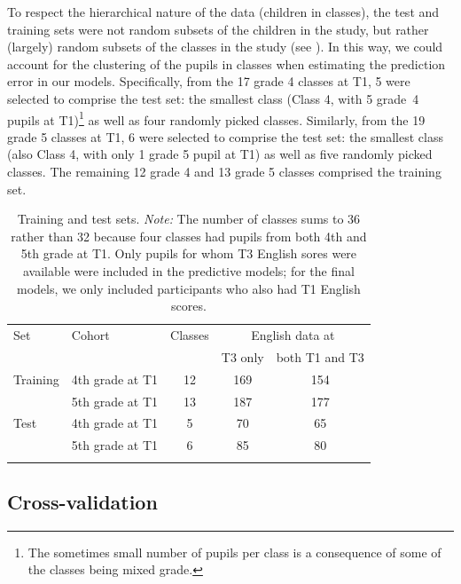 \documentclass[output=paper]{langsci/langscibook}
\begin{document}
To respect the hierarchical nature of the data (children in classes), the test and training sets were not random subsets of the children in the study, but rather (largely) random subsets of the classes in the study (see \citealt{RobertsEtAl2017}). In this way, we could account for the clustering of the pupils in classes when estimating the prediction error in our models. Specifically, from the 17 grade 4 classes at T1, 5 were selected to comprise the test set: the smallest class (Class 4, with 5 grade~4 pupils at T1)\footnote{The sometimes small number of pupils per class is a consequence of some of the classes being mixed grade.} as well as four randomly picked classes. Similarly, from the 19 grade 5 classes at T1, 6 were selected to comprise the test set: the smallest class (also Class 4, with only 1 grade 5 pupil at T1) as well as five randomly picked classes. The remaining 12 grade 4 and 13 grade 5 classes comprised the training set.


\begin{table}
\caption{Training and test sets. \emph{Note:} The number of classes sums to 36 rather than 32 because four classes had pupils from both 4th and 5th grade at T1. Only pupils for whom T3 English sores were available were included in the predictive models; for the final models, we only included participants who also had T1 English scores.\label{tab:04:1}}
\begin{tabular}{ll *{3}{c}}
\lsptoprule
{Set} & {Cohort} & {Classes} & \multicolumn{2}{c}{English data at}\\\cmidrule(lr){4-5}
      &          &           & {T3 only} & {both T1 and T3}\\\midrule
{Training} & {4th grade at T1} & {12} & {169} & {154}\\
           & {5th grade at T1} & {13} & {187} & {177}\\
{Test}     & {4th grade at T1} & {5} & {70} & {65}\\
           & {5th grade at T1} & {6} & {85} & {80}\\
\lspbottomrule
\end{tabular}
\end{table}


\subsection{Cross-validation}
\end{document}
